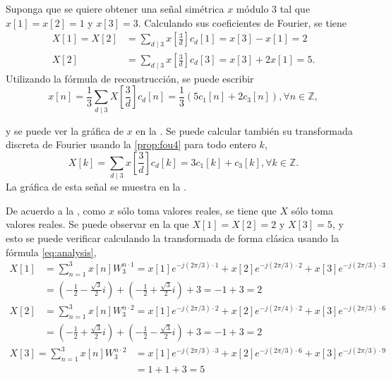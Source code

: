\begin{example}
Suponga que se quiere obtener una señal simétrica $x$ módulo $3$ tal que $x[1]=x[2]=1$ y $x[3]=3$. Calculando sus coeficientes de Fourier, se tiene
\begin{align*}
    X[1] = X[2] & = \sum_{d \mid 3} x \left[ \frac{3}{d} \right] c_d[1] = x[3] - x[1] = 2 \\
    X[2] & = \sum_{d \mid 3} x \left[ \frac{3}{d} \right] c_d[3] = x[3] + 2 x[1] = 5.
\end{align*}
Utilizando la fórmula de reconstrucción, se puede escribir
\begin{equation*}
x[n] = \frac{1}{3} \sum_{d \mid 3} X \left[ \frac{3}{d} \right] c_d[n] = \frac{1}{3} \left( 5 c_1[n] + 2 c_3[n] \right), \forall n \in \mathbb{Z},
\end{equation*}

y se puede ver la gráfica de $x$ en la . Se puede calcular también su transformada discreta de Fourier usando la \cref{prop:fou4} para todo entero $k$,
\begin{equation*}
    X[k] = \sum_{d \mid 3} x \left[ \frac{3}{d} \right] c_d[k] = 3 c_1[k] + c_3[k], \forall k \in \mathbb{Z}.
\end{equation*}
La gráfica de esta señal se muestra en la .
\end{example}

De acuerdo a la , como $x$ sólo toma valores reales, se tiene que $X$ sólo toma valores reales. Se puede observar en la  que $X[1] = X[2] = 2$ y $X[3] = 5$, y esto se puede verificar calculando la transformada de forma clásica usando la fórmula \eqref{eq:analysis},
\begin{align*}
    X[1] & = \sum_{n=1}^{3} x[n] W_3^{n \cdot 1} = x[1] e^{-j(2 \pi / 3) \cdot 1} + x[2] e^{-j(2 \pi / 3) \cdot 2} + x[3] e^{-j(2 \pi / 3) \cdot 3} \\
         & = \left( -\frac{1}{2} - \frac{\sqrt{3}}{2} i \right) + \left(  -\frac{1}{2} + \frac{\sqrt{3}}{2} i \right) + 3 = -1 + 3 = 2
\end{align*}
\begin{align*}
    X[2] & = \sum_{n=1}^{3} x[n] W_3^{n \cdot 2} = x[1] e^{-j(2 \pi / 3) \cdot 2} + x[2] e^{-j(2 \pi / 4) \cdot 2} + x[3] e^{-j(2 \pi / 3) \cdot 6} \\
         & = \left( -\frac{1}{2} + \frac{\sqrt{3}}{2} i \right) + \left(  -\frac{1}{2} - \frac{\sqrt{3}}{2} i \right) + 3 = -1 + 3 = 2
\end{align*}
\begin{align*}
    X[3] = \sum_{n=1}^{3} x[n] W_3^{n \cdot 2} & = x[1] e^{-j(2 \pi / 3) \cdot 3} + x[2] e^{-j(2 \pi / 3) \cdot 6} + x[3] e^{-j(2 \pi / 3) \cdot 9} \\
                                               & = 1 + 1 + 3 = 5
\end{align*}

